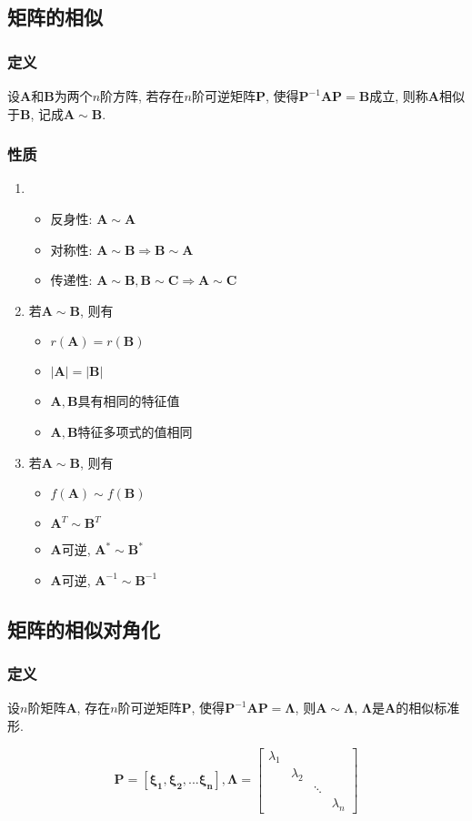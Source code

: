 \subsection{矩阵的相似}
\subsubsection{定义}
设$ \bm{A} $和$ \bm{B} $为两个$ n $阶方阵, 若存在$ n $阶可逆矩阵$ \bm{P} $, 使得$ \bm{P}^{-1}\bm{A}\bm{P}=\bm{B} $成立, 则称$ \bm{A} $相似于$ \bm{B} $, 记成$ \bm{A}\sim \bm{B} $.
\subsubsection{性质}
\begin{enumerate}
	\item \begin{itemize}
		\item 反身性: $ \bm{A}\sim \bm{A} $
		\item 对称性: $ \bm{A}\sim \bm{B}\Rightarrow \bm{B}\sim \bm{A} $
		\item 传递性: $ \bm{A}\sim \bm{B}, \bm{B}\sim \bm{C}\Rightarrow \bm{A}\sim \bm{C} $
	\end{itemize}
	\item 若$ \bm{A}\sim \bm{B} $, 则有\begin{itemize}
		\item $ r(\bm{A})=r(\bm{B}) $
		\item $ \left|\bm{A}\right|=\left|\bm{B}\right| $
		\item $ \bm{A}, \bm{B} $具有相同的特征值
		\item $ \bm{A}, \bm{B} $特征多项式的值相同
	\end{itemize}
	\item 若$ \bm{A}\sim \bm{B} $, 则有\begin{itemize}
		\item $ f(\bm{A})\sim f(\bm{B}) $
		\item $ \bm{A}^{T}\sim \bm{B}^{T} $
		\item $ \bm{A} $可逆, $ \bm{A}^{*}\sim \bm{B}^{*} $
		\item $ \bm{A} $可逆, $ \bm{A}^{-1}\sim \bm{B}^{-1} $
	\end{itemize}
\end{enumerate}
\subsection{矩阵的相似对角化}
\subsubsection{定义}
设$ n $阶矩阵$ \bm{A} $, 存在$ n $阶可逆矩阵$ \bm{P} $, 使得$ \bm{P}^{-1}\bm{A}\bm{P}=\bm{\Lambda} $, 则$ \bm{A}\sim \bm{\Lambda} $, $ \bm{\Lambda} $是$ \bm{A} $的相似标准形.\par 
\[ \bm{P}=\left[\bm{\xi_1}, \bm{\xi_2},... \bm{\xi_n}\right], \bm{\Lambda} =\begin{bmatrix}
	\lambda_1 &  &  &  \\
	& \lambda_2 &  &  \\
	&  & \ddots &  \\
	&  &  & \lambda_n 
\end{bmatrix}
\]
